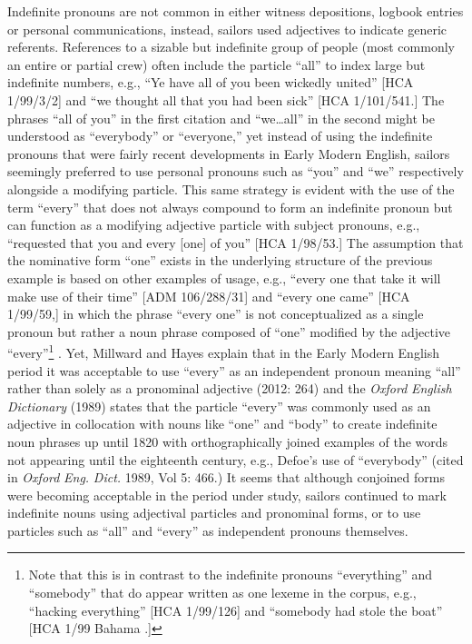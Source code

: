   Indefinite pronouns are not common in either witness depositions, logbook entries or personal communications, instead, sailors used adjectives to indicate generic referents. References to a sizable but indefinite group of people (most commonly an entire or partial crew) often include the particle “all” to index large but indefinite numbers, e.g., “Ye have all of you been wickedly united” [HCA 1/99/3/2] and “we thought all that you had been sick” [HCA 1/101/541.] The phrases “all of you” in the first citation and “we…all” in the second might be understood as “everybody” or “everyone,” yet instead of using the indefinite pronouns that were fairly recent developments in Early Modern English, sailors seemingly preferred to use personal pronouns such as “you” and “we” respectively alongside a modifying particle. This same strategy is evident with the use of the term “every” that does not always compound to form an indefinite pronoun but can function as a modifying adjective particle with subject pronouns, e.g., “requested that you and every [one] of you” [HCA 1/98/53.] The assumption that the nominative form “one” exists in the underlying structure of the previous example is based on other examples of usage, e.g., “every one that take it will make use of their time” [ADM 106/288/31] and “every one came” [HCA 1/99/59,] in which the phrase “every one” is not conceptualized as a single pronoun but rather a noun phrase composed of “one” modified by the adjective “every”\footnote{Note that this is in contrast to the indefinite pronouns “everything” and “somebody” that do appear written as one lexeme in the corpus, e.g., “hacking everything” [HCA 1/99/126] and “somebody had stole the boat” [HCA 1/99 Bahama \citealt{Islands1722}.]} . Yet, Millward and Hayes explain that in the Early Modern English period it was acceptable to use “every” as an independent pronoun meaning “all” rather than solely as a pronominal adjective (2012: 264) and the \textit{Oxford} \textit{English} \textit{Dictionary} (1989) states that the particle “every” was commonly used as an adjective in collocation with nouns like “one” and “body” to create indefinite noun phrases up until 1820 with orthographically joined examples of the words not appearing until the eighteenth century, e.g.,  Defoe’s use of “everybody” (cited in \textit{Oxford} \textit{Eng.} \textit{Dict.} 1989, Vol 5: 466.) It seems that although conjoined forms were becoming acceptable in the period under study, sailors continued to mark indefinite nouns using adjectival particles and pronominal forms, or to use particles such as “all” and “every” as independent pronouns themselves.

